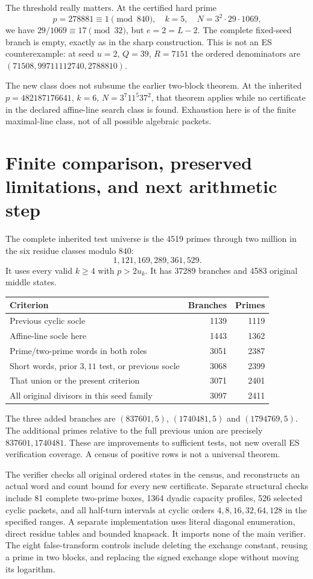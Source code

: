 The threshold really matters. At the certified hard prime
\[
 p=278881\equiv1\pmod{840},\quad k=5,\quad
 N=3^2\cdot29\cdot1069,                                   \tag{E4}
\]
we have $29/1069\equiv17\pmod{32}$, but $e=2=L-2$.
The complete fixed-seed branch is empty, exactly as in the sharp construction.
This is not an ES counterexample: at seed $u=2$, $Q=39$, $R=7151$ the
ordered denominators are $(71508,99711112740,2788810)$.

The new class does not subsume the earlier two-block theorem. At the inherited
$p=482187176641$, $k=6$, $N=3^7 11^5 37^2$, that theorem applies while no
certificate in the declared affine-line search class is found. Exhaustion
here is of the finite maximal-line class, not of all possible algebraic packets.

\section{Finite comparison, preserved limitations, and next arithmetic step}
The complete inherited test universe is the 4519 primes through two million
in the six residue classes modulo $840$:
\[
 1,121,169,289,361,529.
\]
It uses every valid $k\ge4$ with $p>2u_k$. It has 37289 branches and 4583 original middle states.
\begin{center}
\begin{tabular}{lrr}
\toprule
Criterion&Branches&Primes\\\midrule
Previous cyclic socle&1139&1119\\
Affine-line socle here&1443&1362\\
Prime/two-prime words in both roles&3051&2387\\
Short words, prior $3,11$ test, or previous socle&3068&2399\\
That union or the present criterion&3071&2401\\
All original divisors in this seed family&3097&2411\\\bottomrule
\end{tabular}
\end{center}
The three added branches are $(837601,5)$, $(1740481,5)$ and $(1794769,5)$.
The additional primes relative to the full previous union are precisely
$837601,1740481$. These are improvements to sufficient tests, not new overall
ES verification coverage. A census of positive rows is not a universal theorem.

The verifier checks all original ordered states in the census, and reconstructs
an actual word and count bound for every new certificate. Separate structural
checks include 81 complete two-prime boxes, 1364 dyadic capacity profiles,
526 selected cyclic packets, and all half-turn intervals at cyclic orders
$4,8,16,32,64,128$ in the specified ranges. A separate implementation uses
literal diagonal enumeration, direct residue tables and bounded knapsack.
It imports none of the main verifier. The eight false-transform controls
include deleting the exchange constant, reusing a prime in two blocks, and
replacing the signed exchange slope without moving its logarithm.

